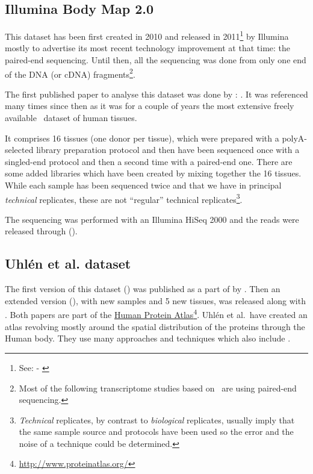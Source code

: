 \subsection{Illumina Body Map 2.0}

This dataset has been first created in 2010 and released in
2011\footnote{See:  - \cite{ibmEnsembl}} by Illumina
mostly to advertise its most recent technology improvement at that time:
the paired-end sequencing.
Until then, all the sequencing was done from only one end of the \gls{DNA} (or
\gls{cDNA}) fragments\footnote{Most of the following transcriptome
studies based on \Rnaseq\ are using paired-end sequencing.}.

The first published paper to analyse this dataset was done by
\citet{ibmrelatedpaper}: .
It was referenced many times since then as it was for a couple of years
the most extensive freely available \Rnaseq\ dataset of human tissues.

It comprises 16 tissues (one donor per tissue), which were prepared with a
polyA-selected library preparation protocol and then have been sequenced once
with a singled-end protocol and then a second time with a paired-end one. There
are some added libraries which have been created by mixing together the 16 tissues.
While each sample has been sequenced twice and that we have in principal
\emph{technical} replicates, these are not ``regular'' technical
replicates\footnote{\emph{Technical} replicates,
by contrast to \emph{biological} replicates,
usually imply that the same sample source and protocols have been used so the
error and the noise of a technique could be determined.}.

The sequencing was performed with an Illumina HiSeq 2000 and the reads were
released through  ().


\subsection{Uhlén et al. dataset}

The first version of this dataset () was published
as a part of  by \citet{Uhlen2014}. Then an extended
version (), with new samples and 5 new tissues,
was released along with  \citep{Uhlen2015}.
Both papers are part of the
\href{http://www.proteinatlas.org/}{Human Protein Atlas}\footnote{
    \href{http://www.proteinatlas.org/}{http://www.proteinatlas.org/}}.
Uhlén et al.\ have created
an atlas revolving mostly around the spatial distribution of the proteins through
the Human body. They use many approaches and techniques which also include \Rnaseq.


